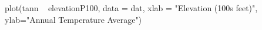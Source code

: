 \begin{Schunk}
\begin{Sinput}
 plot(tann ~ elevationP100, data = dat, xlab = "Elevation (100s feet)", ylab="Annual Temperature Average")
\end{Sinput}
\end{Schunk}
